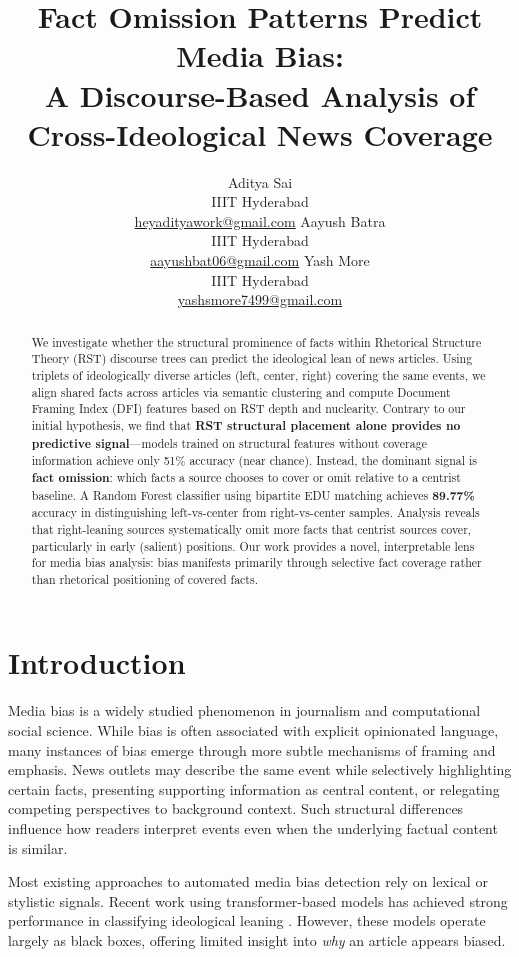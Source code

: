 \documentclass[11pt]{article}
\title{Fact Omission Patterns Predict Media Bias: \\
A Discourse-Based Analysis of Cross-Ideological News Coverage}
\author{
Aditya Sai \\
IIIT Hyderabad \\
\url{heyadityawork@gmail.com}
\And
Aayush Batra \\
IIIT Hyderabad \\
\url{aayushbat06@gmail.com}
\And
Yash More \\
IIIT Hyderabad \\
\url{yashsmore7499@gmail.com}
}
\begin{document}
\maketitle

\begin{abstract}
We investigate whether the structural prominence of facts within Rhetorical Structure Theory (RST) discourse trees can predict the ideological lean of news articles. Using triplets of ideologically diverse articles (left, center, right) covering the same events, we align shared facts across articles via semantic clustering and compute Document Framing Index (DFI) features based on RST depth and nuclearity. Contrary to our initial hypothesis, we find that \textbf{RST structural placement alone provides no predictive signal}---models trained on structural features without coverage information achieve only 51\% accuracy (near chance). Instead, the dominant signal is \textbf{fact omission}: which facts a source chooses to cover or omit relative to a centrist baseline. A Random Forest classifier using bipartite EDU matching achieves \textbf{89.77\%} accuracy in distinguishing left-vs-center from right-vs-center samples. Analysis reveals that right-leaning sources systematically omit more facts that centrist sources cover, particularly in early (salient) positions. Our work provides a novel, interpretable lens for media bias analysis: bias manifests primarily through selective fact coverage rather than rhetorical positioning of covered facts.
\end{abstract}

\section{Introduction}

Media bias is a widely studied phenomenon in journalism and computational social science. While bias is often associated with explicit opinionated language, many instances of bias emerge through more subtle mechanisms of framing and emphasis. News outlets may describe the same event while selectively highlighting certain facts, presenting supporting information as central content, or relegating competing perspectives to background context. Such structural differences influence how readers interpret events even when the underlying factual content is similar.

Most existing approaches to automated media bias detection rely on lexical or stylistic signals. Recent work using transformer-based models has achieved strong performance in classifying ideological leaning \citep{Menzner_2024}. However, these models operate largely as black boxes, offering limited insight into \emph{why} an article appears biased.
\end{document}
